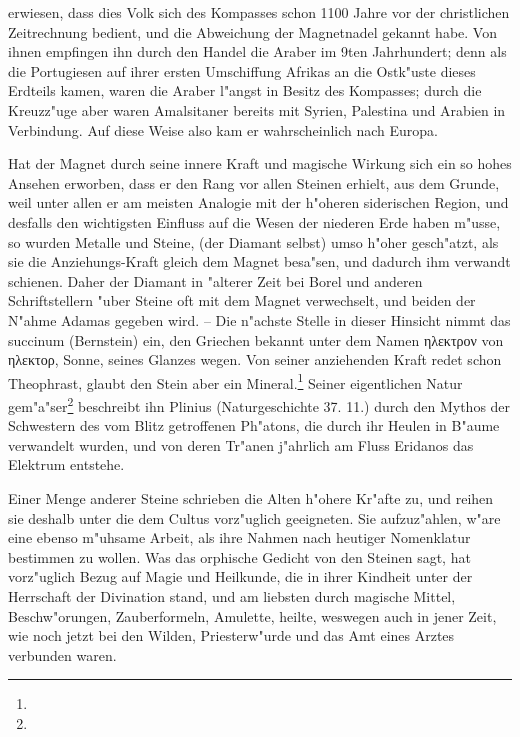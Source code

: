 \documentclass[a4paper, 11pt, oneside, polutonikogreek, german]{article}
\begin{document}
erwiesen, dass dies Volk sich des Kompasses schon 1100 Jahre vor der christlichen Zeitrechnung bedient, und die Abweichung der Magnetnadel gekannt habe. Von ihnen empfingen ihn durch den Handel die Araber im 9ten Jahrhundert; denn als die Portugiesen auf ihrer ersten Umschiffung Afrikas an die Ostk"uste dieses Erdteils kamen, waren die Araber l"angst in Besitz des Kompasses; durch die Kreuzz"uge aber waren Amalsitaner bereits mit Syrien, Palestina und Arabien in Verbindung. Auf diese Weise also kam er wahrscheinlich nach Europa.

Hat der Magnet durch seine innere Kraft und magische Wirkung sich ein so hohes Ansehen erworben, dass er den Rang vor allen Steinen erhielt, aus dem Grunde, weil unter allen er am meisten Analogie mit der h"oheren siderischen Region, und desfalls den wichtigsten Einfluss auf die Wesen der niederen Erde haben m"usse, so wurden Metalle und Steine, (der Diamant selbst) umso h"oher gesch"atzt, als sie die Anziehungs-Kraft gleich dem Magnet besa"sen, und dadurch ihm verwandt schienen. Daher der Diamant in "alterer Zeit bei Borel und anderen Schriftstellern "uber Steine oft mit dem Magnet verwechselt, und beiden der N"ahme Adamas gegeben wird. -- Die n"achste Stelle in dieser Hinsicht nimmt das succinum (Bernstein) ein, den Griechen bekannt unter dem Namen ηλεκτρον von ηλεκτορ, Sonne, seines Glanzes wegen. Von seiner anziehenden Kraft redet schon Theophrast, glaubt den Stein aber ein Mineral.\footnote{} Seiner eigentlichen Natur gem"a"ser\footnote{} beschreibt ihn Plinius (Naturgeschichte 37. 11.) durch den Mythos der Schwestern des vom Blitz getroffenen Ph"atons, die durch ihr Heulen in B"aume verwandelt wurden, und von deren Tr"anen j"ahrlich am Fluss Eridanos das Elektrum entstehe.

Einer Menge anderer Steine schrieben die Alten h"ohere Kr"afte zu, und reihen sie deshalb unter die dem Cultus vorz"uglich geeigneten. Sie aufzuz"ahlen, w"are eine ebenso m"uhsame Arbeit, als ihre Nahmen nach heutiger Nomenklatur bestimmen zu wollen. Was das orphische Gedicht von den Steinen sagt, hat vorz"uglich Bezug auf Magie und Heilkunde, die in ihrer Kindheit unter der Herrschaft der Divination stand, und am liebsten durch magische Mittel, Beschw"orungen, Zauberformeln, Amulette, heilte, weswegen auch in jener Zeit, wie noch jetzt bei den Wilden, Priesterw"urde und das Amt eines Arztes verbunden waren.
\end{document}

